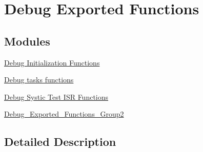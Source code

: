 \hypertarget{group___debug___exported___functions}{}\section{Debug Exported Functions}
\label{group___debug___exported___functions}
\subsection*{Modules}
\begin{DoxyCompactItemize}
\item 
\hyperlink{group___debug___exported___functions___group1}{Debug Initialization Functions}
\item 
\hyperlink{group___debug___exported___functions___group3}{Debug tasks functions}
\item 
\hyperlink{group___debug___exported___functions___group4}{Debug Systic Test I\+S\+R Functions}
\item 
\hyperlink{group___debug___exported___functions___group2}{Debug\+\_\+\+Exported\+\_\+\+Functions\+\_\+\+Group2}
\end{DoxyCompactItemize}


\subsection{Detailed Description}
